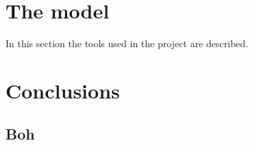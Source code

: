 \documentclass[12pt,a4paper,hidelinks]{article}
\begin{document}
\section{The model}\label{sec:model}
In this section the tools used in the project are described.

\section{Conclusions}\label{sec:conclusions}

\subsection{Boh}



\end{document}
